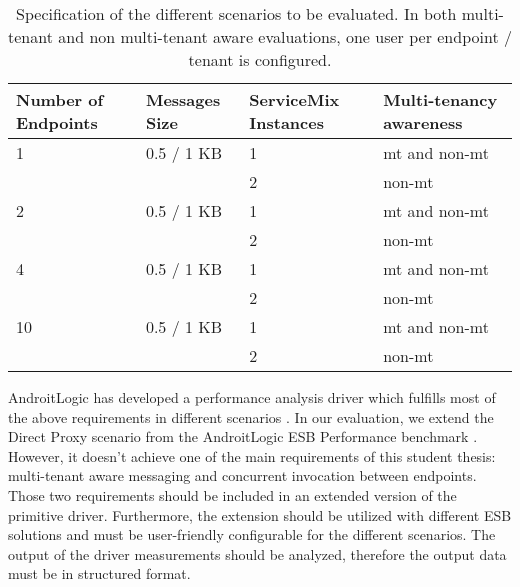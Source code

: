 \begin{table}[htbp]
\centering
\begin{tabular}{llll}

	\toprule
	 Number of Endpoints 		& Messages Size	& ServiceMix Instances		& Multi-tenancy awareness 		\\
	 \midrule
	 
	 1 						& 0.5 / 1 KB 		& 1						& mt and non-mt									\\
	  						& 				& 2						& non-mt											\\
	 2 						& 0.5 / 1 KB 		& 1						& mt and non-mt									\\
	  						& 				& 2						& non-mt											\\
	 4 						& 0.5 / 1 KB 		& 1						& mt and non-mt									\\
	  						& 				& 2						& non-mt											\\
	 10 						& 0.5 / 1 KB 		& 1						& mt and non-mt									\\
	  						& 				& 2						& non-mt											\\														
	 
	\bottomrule
\end{tabular}
\caption[ServiceMix evaluation performance scenarios]{Specification of the different scenarios to be evaluated. In both multi-tenant and non multi-tenant aware evaluations, one user per endpoint / tenant is configured. \\ }
	\label{tab:evaluation}
\end{table}

AndroitLogic has developed a performance analysis driver which fulfills most of the above requirements in different scenarios \cite{androit2012}. In our evaluation, we extend the Direct Proxy scenario from the AndroitLogic  \ac{ESB} Performance benchmark \cite{androit2012}. However, it doesn't achieve one of the main requirements of this student thesis: multi-tenant aware messaging and concurrent invocation between endpoints. Those two requirements should be included in an extended version of the primitive driver. Furthermore, the extension should be utilized with different \ac{ESB} solutions and must be user-friendly configurable for the different scenarios. The output of the driver measurements should be analyzed, therefore the output data must be in structured format. 



\FloatBarrier